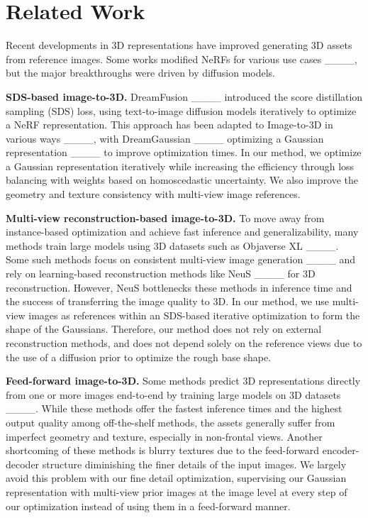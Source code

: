 \section{Related Work}
\label{related_work}
Recent developments in 3D representations have improved generating 3D assets from reference images. Some works modified NeRFs for various use cases ____, but the major breakthroughs were driven by diffusion models.

\noindent \textbf{SDS-based image-to-3D. }DreamFusion ____ introduced the score distillation sampling (SDS) loss, using text-to-image diffusion models iteratively to optimize a NeRF representation. This approach has been adapted to Image-to-3D in various ways ____, with DreamGaussian ____ optimizing a Gaussian representation ____ to improve optimization times. In our method, we optimize a Gaussian representation iteratively while increasing the efficiency through loss balancing with weights based on homoscedastic uncertainty. We also improve the geometry and texture consistency with multi-view image references. 

\noindent \textbf{Multi-view reconstruction-based image-to-3D. }To move away from instance-based optimization and achieve fast inference and generalizability, many methods train large models using 3D datasets such as Objaverse XL ____. Some such methods focus on consistent multi-view image generation ____ and rely on learning-based reconstruction methods like NeuS ____ for 3D reconstruction. However, NeuS bottlenecks these methods in inference time and the success of transferring the image quality to 3D. In our method, we use multi-view images as references within an SDS-based iterative optimization to form the shape of the Gaussians. Therefore, our method does not rely on external reconstruction methods, and does not depend solely on the reference views due to the use of a diffusion prior to optimize the rough base shape.%

\noindent \textbf{Feed-forward image-to-3D. } Some methods predict 3D representations directly from one or more images end-to-end by training large models on 3D datasets ____. While these methods offer the fastest inference times and the highest output quality among off-the-shelf methods, the assets generally suffer from imperfect geometry and texture, especially in non-frontal views. Another shortcoming of these methods is blurry textures due to the feed-forward encoder-decoder structure diminishing the finer details of the input images. We largely avoid this problem with our fine detail optimization, supervising our Gaussian representation with multi-view prior images at the image level at every step of our optimization instead of using them in a feed-forward manner.
